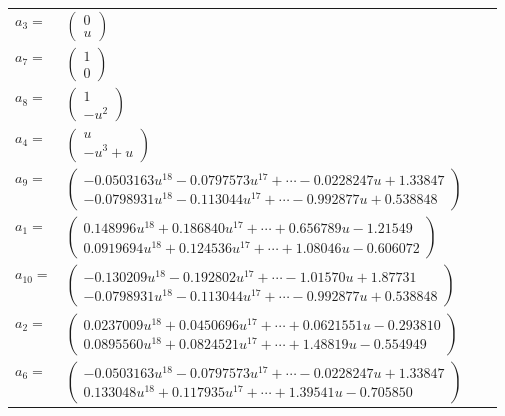 \documentclass[1p]{elsarticle_modified}
\theoremstyle{definition}
\begin{document}
\begin{tabular}{m{7pt} m{180pt} m{7pt} m{180pt} }
\flushright $a_{3}=$&$\begin{pmatrix}0\\u\end{pmatrix}$ \\
\flushright $a_{7}=$&$\begin{pmatrix}1\\0\end{pmatrix}$ \\
\flushright $a_{8}=$&$\begin{pmatrix}1\\- u^2\end{pmatrix}$ \\
\flushright $a_{4}=$&$\begin{pmatrix}u\\- u^3+u\end{pmatrix}$ \\
\flushright $a_{9}=$&$\begin{pmatrix}-0.0503163 u^{18}-0.0797573 u^{17}+\cdots-0.0228247 u+1.33847\\-0.0798931 u^{18}-0.113044 u^{17}+\cdots-0.992877 u+0.538848\end{pmatrix}$ \\
\flushright $a_{1}=$&$\begin{pmatrix}0.148996 u^{18}+0.186840 u^{17}+\cdots+0.656789 u-1.21549\\0.0919694 u^{18}+0.124536 u^{17}+\cdots+1.08046 u-0.606072\end{pmatrix}$ \\
\flushright $a_{10}=$&$\begin{pmatrix}-0.130209 u^{18}-0.192802 u^{17}+\cdots-1.01570 u+1.87731\\-0.0798931 u^{18}-0.113044 u^{17}+\cdots-0.992877 u+0.538848\end{pmatrix}$ \\
\flushright $a_{2}=$&$\begin{pmatrix}0.0237009 u^{18}+0.0450696 u^{17}+\cdots+0.0621551 u-0.293810\\0.0895560 u^{18}+0.0824521 u^{17}+\cdots+1.48819 u-0.554949\end{pmatrix}$ \\
\flushright $a_{6}=$&$\begin{pmatrix}-0.0503163 u^{18}-0.0797573 u^{17}+\cdots-0.0228247 u+1.33847\\0.133048 u^{18}+0.117935 u^{17}+\cdots+1.39541 u-0.705850\end{pmatrix}$ \\

\end{tabular}
\end{document}

